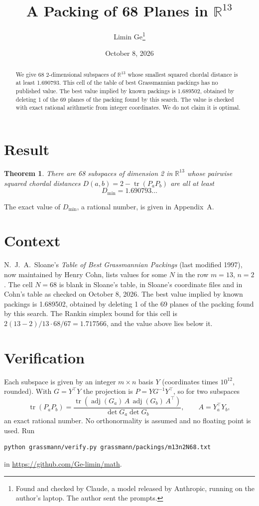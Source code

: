 \documentclass[11pt,a4paper]{article}
\title{A Packing of 68 Planes in $\mathbb{R}^{13}$}
\author{Limin Ge\thanks{Found and checked by Claude, a model released by Anthropic, running on the author's laptop. The author sent the prompts.}}
\date{October 8, 2026}
\newtheorem*{theorem}{Theorem}
\begin{document}
\maketitle
\begin{abstract}
We give 68 2-dimensional subspaces of $\mathbb{R}^{13}$ whose smallest squared chordal distance is at least 1.690793. This cell of the table of best Grassmannian packings has no published value. The best value implied by known packings is 1.689502, obtained by deleting 1 of the 69 planes of the packing found by this search. The value is checked with exact rational arithmetic from integer coordinates. We do not claim it is optimal.
\end{abstract}

\section{Result}
\begin{theorem}
There are 68 subspaces of dimension 2 in $\mathbb{R}^{13}$ whose pairwise squared chordal distances $D(a,b) = 2 - \operatorname{tr}(P_aP_b)$ are all at least
\[ D_{\min} = 1.690793\ldots \]
\end{theorem}
The exact value of $D_{\min}$, a rational number, is given in Appendix~A.


\section{Context}
N.~J.~A.~Sloane's \emph{Table of Best Grassmannian Packings} (last modified 1997), now maintained by Henry Cohn, lists values for some $N$ in the row $m=13$, $n=2$. The cell $N=68$ is blank in Sloane's table, in Sloane's coordinate files and in Cohn's table as checked on October 8, 2026. The best value implied by known packings is 1.689502, obtained by deleting 1 of the 69 planes of the packing found by this search. The Rankin simplex bound for this cell is $2(13-2)/13\cdot 68/67 = 1.717566$, and the value above lies below it.


\section{Verification}
Each subspace is given by an integer $m\times n$ basis $Y$ (coordinates times $10^{12}$, rounded). With $G=Y^\top Y$ the projection is $P=YG^{-1}Y^\top$, so for two subspaces
\[ \operatorname{tr}(P_aP_b)=\frac{\operatorname{tr}(\operatorname{adj}(G_a)\,A\,\operatorname{adj}(G_b)\,A^\top)}{\det G_a\det G_b},\qquad A=Y_a^\top Y_b, \]
an exact rational number. No orthonormality is assumed and no floating point is used. Run
\begin{verbatim}
python grassmann/verify.py grassmann/packings/m13n2N68.txt
\end{verbatim}
in \url{https://github.com/Ge-limin/math}.
\end{document}
